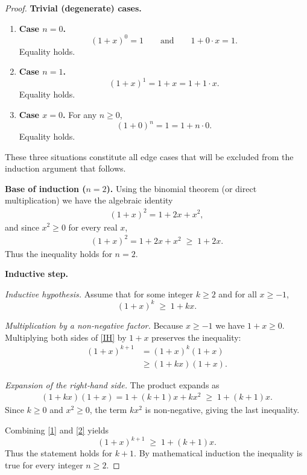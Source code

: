 \begin{proof}
\textbf{Trivial (degenerate) cases.}
\begin{enumerate}
\item \textbf{Case \(n=0\).}  
\[
(1+x)^{0}=1 \qquad\text{and}\qquad 1+0\cdot x =1 .
\]  
Equality holds.

\item \textbf{Case \(n=1\).}  
\[
(1+x)^{1}=1+x = 1+1\cdot x .
\]  
Equality holds.

\item \textbf{Case \(x=0\).} For any \(n\ge 0\),
\[
(1+0)^{n}=1 = 1+n\cdot 0 .
\]  
Equality holds.
\end{enumerate}
These three situations constitute all edge cases that will be excluded from the induction argument that follows.

\medskip
\textbf{Base of induction (\(n=2\)).}  
Using the binomial theorem (or direct multiplication) we have the algebraic identity
\begin{align*}
(1+x)^{2}=1+2x+x^{2},
\end{align*}
and since \(x^{2}\ge 0\) for every real \(x\),
\begin{align*}
(1+x)^{2}=1+2x+x^{2}\;\ge\;1+2x .
\end{align*}
Thus the inequality holds for \(n=2\).

\medskip
\textbf{Inductive step.}

\textit{Inductive hypothesis.}  
Assume that for some integer \(k\ge 2\) and for all \(x\ge -1\),
\begin{equation}
(1+x)^{k}\;\ge\;1+kx .\tag{IH}
\end{equation}

\textit{Multiplication by a non‑negative factor.}  
Because \(x\ge -1\) we have \(1+x\ge 0\). Multiplying both sides of \eqref{IH} by \(1+x\) preserves the inequality:
\begin{align}
(1+x)^{k+1}&=(1+x)^{k}(1+x) \nonumber\\
&\ge (1+kx)(1+x). \tag{1}
\end{align}

\textit{Expansion of the right‑hand side.}  
The product expands as
\begin{align}
(1+kx)(1+x)=1+(k+1)x+kx^{2}\;\ge\;1+(k+1)x .\tag{2}
\end{align}
Since \(k\ge 0\) and \(x^{2}\ge 0\), the term \(kx^{2}\) is non‑negative, giving the last inequality.

Combining \eqref{1} and \eqref{2} yields
\[
(1+x)^{k+1}\;\ge\;1+(k+1)x .
\]
Thus the statement holds for \(k+1\). By mathematical induction the inequality is true for every integer \(n\ge 2\).


\end{proof}
